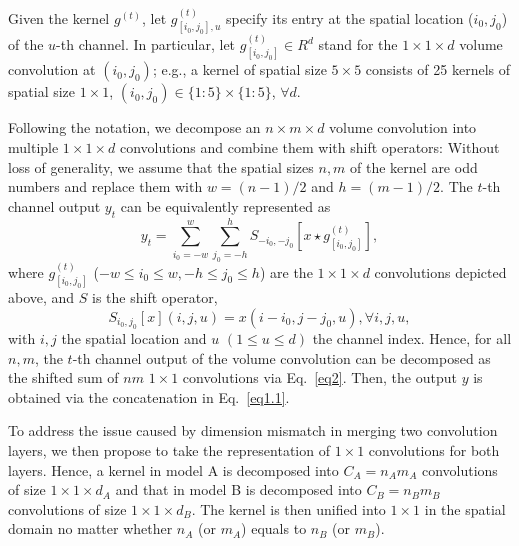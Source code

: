 \documentclass{article}
\begin{document}
	Given the kernel $g^{(t)}$, let $g^{(t)}_{[i_0,j_0],u}$ specify its entry at the spatial location ($i_0,j_0$) of the $u$-th channel. In particular, let $g_{[i_0,j_0]}^{(t)}\in R^d$ stand for the $1\times 1 \times d$ volume convolution at $(i_0,j_0)$; %
	e.g., a kernel of spatial size $5\times 5$ consists of 25 kernels of spatial size $1\times 1$, $(i_0, j_0) \in \{1 : 5\} \times \{1 : 5\}$, $\forall d$.
	
	Following the notation, we decompose an $n\times m \times d$ volume convolution into multiple $1\times 1 \times d$ convolutions and combine them with shift operators:
	Without loss of generality, we assume that the spatial sizes $n, m$ of the kernel are odd numbers and replace them with $w=(n-1)/2$ and $h=(m-1)/2$.
	The $t$-th channel output $y_t$ can be equivalently represented as
	\begin{equation}
	\label{eq2}
	y_t =\sum_{i_0=-w}^{w}\sum_{j_0=-h}^{h} S_{-i_0, -j_0}[x \star g_{[i_0,j_0]}^{(t)}],
	\end{equation}
	where $g_{[i_0,j_0]}^{(t)}$ ($-w\leq i_0 \leq w, -h\leq j_0 \leq h$) are the $1\times 1 \times d $ convolutions depicted above, and %
	$S$ is the shift operator, %
	\begin{equation}
	S_{i_0,j_0}[x](i,j,u)= x(i-i_0,j-j_0,u), \forall i, j, u,
	\end{equation}
	with $i,j$ the spatial location and $u$ $(1\leq u \leq d)$ the channel index.
	Hence, for all $n,m$, the $t$-th channel output of the volume convolution can be decomposed as the shifted sum of $nm$ $1\times 1$ convolutions via Eq.~\ref{eq2}.
	Then, the output $y$ is obtained via the concatenation in Eq.~\ref{eq1.1}.
	
	
	
	
	
	To address the issue caused by dimension mismatch in merging two convolution layers, we then propose to take the representation of $1 \times 1$ convolutions for both layers. %
	Hence, a kernel in model A is decomposed into $C_A=n_A m_A$ convolutions of size $1\times 1 \times d_A$ and that in model B is decomposed into $C_B=n_B m_B$ convolutions of size $1\times 1 \times d_B$.
	The kernel is then unified into $1 \times 1$ in the spatial domain no matter whether $n_A$ (or $m_A$) equals to $n_B$ (or $m_B$).
	
\end{document}
